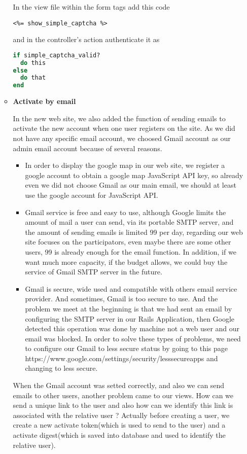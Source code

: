 \begin{enumerate}
\begin{itemize}
In the view file within the form tags add this code
\begin{lstlisting}
<%= show_simple_captcha %>
\end{lstlisting}

and in the controller's action authenticate it as
\begin{lstlisting}[language=Ruby]
if simple_captcha_valid?
  do this
else
  do that
end
\end{lstlisting}

\item{\textbf{Activate by email}}


In the new web site, we also added the function of sending emails to activate the new account when one user registers on the site. As we did not have any specific email account, we choosed Gmail account as our admin email account because of several reasons.
\begin{itemize}
\item In order to display the google map in our web site, we register a google account to obtain a google map JavaScript API key, so already even we did not choose Gmail as our main email, we should at least use the google account for JavaScript API.
\item Gmail service is free and easy to use, although Google limits the amount of mail a user can send, via its portable SMTP server, and the amount of sending emails is limited 99 per day, regarding our web site focuses on the participators, even maybe there are some other users, 99 is already enough for the email function. In addition, if we want much more capacity, if the budget allows, we could buy the service of Gmail SMTP server in the future.
\item Gmail is secure, wide used and compatible with others email service provider. And sometimes, Gmail is too secure to use. And the problem we meet at the beginning is that we had sent an email by configuring the SMTP server in our Rails Application, then Google detected this operation was done by machine not a web user and our email was blocked. In order to solve these types of problems, we need to configure our Gmail to less secure status by going to this page https://www.google.com/settings/security/lesssecureapps and changing to less secure.
\end{itemize}
When the Gmail account was setted correctly, and also we can send emails to other users, another problem came to our views. How can we send a unique link to the user and also how can we identify this link is associated with the relative user ? Actually before creating a user, we create a new activate token(which is used to send to the user) and a activate digest(which is saved into database and used to identify the relative user). 

\end{itemize}
\end{enumerate}
